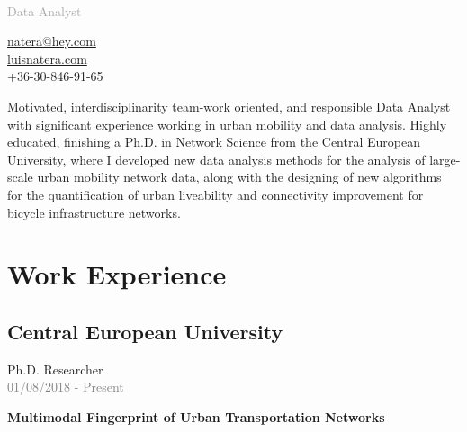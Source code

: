 \documentclass{academiccv}
\begin{document}
\raggedright

\namefont{\myname}\\
\vspace{1em}
\textcolor{darkgray}{{\Large Data Analyst}}

\vspace{1em}
\begin{minipage}[t]{0.495\textwidth}
  \href{mailto:natera@hey.com}{natera@hey.com}\\
  \href{https://luisnatera.com}{luisnatera.com} \\
  +36-30-846-91-65
\end{minipage}
\vspace{2.5em}

Motivated, interdisciplinarity team-work oriented, and responsible Data Analyst with significant experience working in urban mobility and data analysis. Highly educated, finishing a Ph.D. in Network Science from the Central European University, where I developed new data analysis methods for the analysis of large-scale urban mobility network data, along with the designing of new algorithms for the quantification of urban liveability and connectivity improvement for bicycle infrastructure networks.

\section*{Work Experience}
\subsection*{Central European University}
{\large Ph.D. Researcher}\\
\textcolor{gray}{{\small 01/08/2018 - Present}}\\

\begin{list}{}{}
  \item{\textbf{Multimodal Fingerprint of Urban Transportation Networks}}
    
\end{list}
\end{document}
